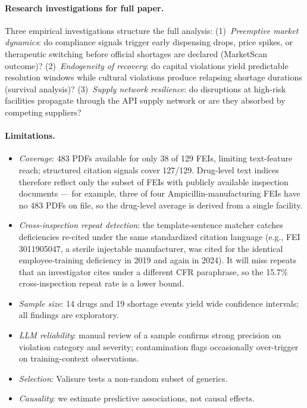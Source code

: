 \documentclass[12pt]{article}
\begin{document}
\paragraph{Research investigations for full paper.}
Three empirical investigations structure the full analysis:
(1)~\emph{Preemptive market dynamics}: do compliance signals trigger early
dispensing drops, price spikes, or therapeutic switching before official
shortages are declared (MarketScan outcome)?
(2)~\emph{Endogeneity of recovery}: do capital violations yield predictable
resolution windows while cultural violations produce relapsing shortage durations
(survival analysis)?
(3)~\emph{Supply network resilience}: do disruptions at high-risk facilities
propagate through the API supply network or are they absorbed by competing
suppliers?

\paragraph{Limitations.}
\begin{itemize}[noitemsep]
  \item \textit{Coverage}: 483 PDFs available for only 38 of 129 FEIs, limiting
        text-feature reach; structured citation signals cover 127/129.
        Drug-level text indices therefore reflect only the subset of FEIs with
        publicly available inspection documents — for example, three of four
        Ampicillin-manufacturing FEIs have no 483 PDFs on file, so the
        drug-level average is derived from a single facility.
  \item \textit{Cross-inspection repeat detection}: the template-sentence
        matcher catches deficiencies re-cited under the same standardized
        citation language (e.g., FEI 3011905047, a sterile injectable
        manufacturer, was cited for the identical employee-training
        deficiency in 2019 and again in 2024).
        It will miss repeats that an investigator cites under a different
        CFR paraphrase, so the 15.7\% cross-inspection repeat rate is a
        lower bound.
  \item \textit{Sample size}: 14 drugs and 19 shortage events yield wide
        confidence intervals; all findings are exploratory.
  \item \textit{LLM reliability}: manual review of a sample confirms strong
        precision on violation category and severity; contamination flags
        occasionally over-trigger on training-context observations.
  \item \textit{Selection}: Valisure tests a non-random subset of generics.
  \item \textit{Causality}: we estimate predictive associations, not causal effects.
\end{itemize}
\end{document}
